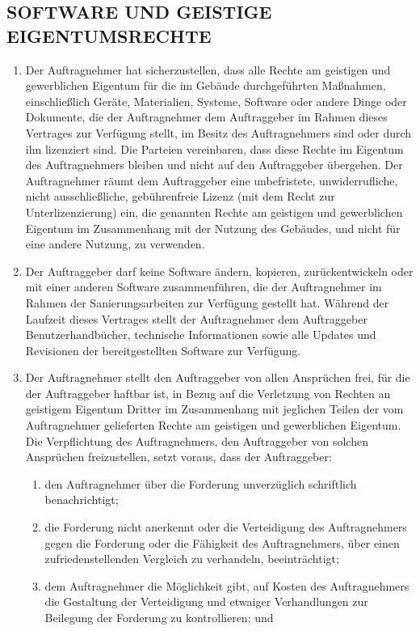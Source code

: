 \begin{multicols}{2}
   \subsection{SOFTWARE UND GEISTIGE EIGENTUMSRECHTE}
   \begin{enumerate}
   \item Der Auftragnehmer hat sicherzustellen, dass alle Rechte am geistigen und gewerblichen Eigentum für die im Gebäude durchgeführten Maßnahmen, einschließlich Geräte, Materialien, Systeme, Software oder andere Dinge oder Dokumente, die der Auftragnehmer dem Auftraggeber im Rahmen dieses Vertrages zur Verfügung stellt, im Besitz des Auftragnehmers sind oder durch ihn lizenziert sind. Die Parteien vereinbaren, dass diese Rechte im Eigentum des Auftragnehmers bleiben und nicht auf den Auftraggeber übergehen. Der Auftragnehmer räumt dem Auftraggeber eine unbefristete, unwiderrufliche, nicht ausschließliche, gebührenfreie Lizenz (mit dem Recht zur Unterlizenzierung) ein, die genannten Rechte am geistigen und gewerblichen Eigentum im Zusammenhang mit der Nutzung des Gebäudes, und nicht für eine andere Nutzung, zu verwenden.
   \item Der Auftraggeber darf keine Software ändern, kopieren, zurückentwickeln oder mit einer anderen Software zusammenführen, die der Auftragnehmer im Rahmen der Sanierungsarbeiten zur Verfügung gestellt hat. Während der Laufzeit dieses Vertrages stellt der Auftragnehmer dem Auftraggeber Benutzerhandbücher, technische Informationen sowie alle Updates und Revisionen der bereitgestellten Software zur Verfügung.
   \item Der Auftragnehmer stellt den Auftraggeber von allen Ansprüchen frei, für die der Auftraggeber haftbar ist, in Bezug auf die Verletzung von Rechten an geistigem Eigentum Dritter im Zusammenhang mit jeglichen Teilen der vom Auftragnehmer gelieferten Rechte am geistigen und gewerblichen Eigentum. Die Verpflichtung des Auftragnehmers, den Auftraggeber von solchen Ansprüchen freizustellen, setzt voraus, dass der Auftraggeber:
   \begin{enumerate}
   \item den Auftragnehmer über die Forderung unverzüglich schriftlich benachrichtigt;
   \item die Forderung nicht anerkennt oder die Verteidigung des Auftragnehmers gegen die Forderung oder die Fähigkeit des Auftragnehmers, über einen zufriedenstellenden Vergleich zu verhandeln, beeinträchtigt;
   \item dem Auftragnehmer die Möglichkeit gibt, auf Kosten des Auftragnehmers die Gestaltung der Verteidigung und etwaiger Verhandlungen zur Beilegung der Forderung zu kontrollieren; und

\end{enumerate}
\end{enumerate}
\end{multicols}
